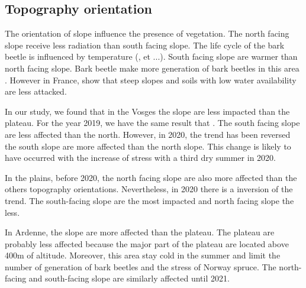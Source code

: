 \documentclass[3p,procedia]{elsarticle}
\begin{document}
\subsection{Topography orientation}


The orientation of slope influence the presence of vegetation. The north facing slope receive less radiation than south facing slope. 
The life cycle of the bark beetle is influenced by temperature (\cite{baier_phenipscomprehensive_2007}, et ...). South facing slope are warmer than north facing slope.
Bark beetle make more generation of bark beetles in this area \cite{}. 
However in France, \cite{nardi_drought_2022} show that steep slopes and soils with low water availability are less attacked. 

In our study, we found that in the Vosges the slope are less impacted than the plateau. 
For the year 2019, we have the same result that \cite{nardi_drought_2022}. 
The south facing slope are less affected than the north. 
However, in 2020, the trend has been reversed the south slope are more affected than the north slope. 
This change is likely to have occurred with the increase of stress with a third dry summer in 2020.

In the plains, before 2020, the north facing slope are also more affected than the others topography orientations. 
Nevertheless, in 2020 there is a inversion of the trend. 
The south-facing slope are the most impacted and north facing slope the less.

In Ardenne, the slope are more affected than the plateau. The plateau are probably less affected because the major part of the plateau are located above 400m of altitude.
Moreover, this area stay cold in the summer and limit the number of generation of bark beetles and the stress of Norway spruce.
The north-facing and south-facing slope are similarly affected until 2021. 


 

\end{document}
